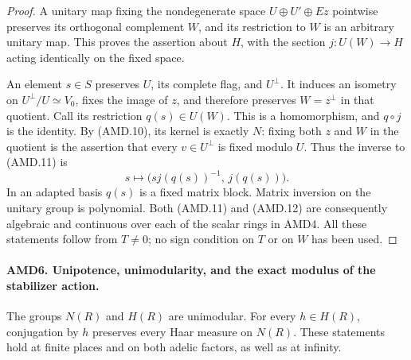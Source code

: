 \documentclass[11pt,a4paper]{article}
\numberwithin{equation}{section}
\theoremstyle{remark}\newtheorem{remark}[theorem]{Remark}
\begin{document}
\begin{proof}
A unitary map fixing the nondegenerate space
\(U\oplus U'\oplus Ez\) pointwise preserves its orthogonal
complement \(W\), and its restriction to \(W\) is an arbitrary
unitary map.  This proves the assertion about \(H\), with the
section \(j:U(W)\to H\) acting identically on the fixed space.

An element \(s\in S\) preserves \(U\), its complete flag,
and \(U^\perp\).  It induces an isometry on
\(U^\perp/U\simeq V_0\), fixes the image of \(z\), and
therefore preserves \(W=z^\perp\) in that quotient.  Call its
restriction \(q(s)\in U(W)\).  This is a homomorphism, and
\(q\circ j\) is the identity.  By (AMD.10), its kernel is
exactly \(N\): fixing both \(z\) and \(W\) in the quotient
is the assertion that every \(v\in U^\perp\) is fixed
modulo \(U\).  Thus the inverse to (AMD.11) is
\[
       s\longmapsto\bigl(sj(q(s))^{-1},\,j(q(s))\bigr).
 \tag{AMD.12}
\]
In an adapted basis \(q(s)\) is a fixed matrix block.  Matrix
inversion on the unitary group is polynomial.  Both (AMD.11)
and (AMD.12) are consequently algebraic and continuous over
each of the scalar rings in AMD4.  All these statements follow
from \(T\ne0\); no sign condition on \(T\) or on \(W\)
has been used.
\end{proof}

\paragraph{AMD6. Unipotence, unimodularity, and the exact modulus of the stabilizer action.}
\label{claim:AMD6}
The groups \(N(R)\) and \(H(R)\) are unimodular.  For every
\(h\in H(R)\), conjugation by \(h\) preserves every Haar
measure on \(N(R)\).  These statements hold at finite places
and on both adelic factors, as well as at infinity.
\end{document}
